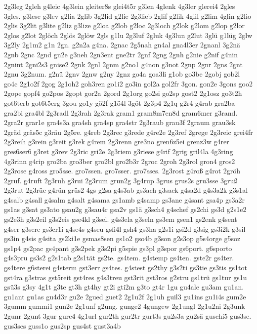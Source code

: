 {2g3leg
2gleh
g4leic
4g3lein
gleiter8s
glei4t5r
g3len
4glenk
4g3ler
glerei4
2gles
3gles.
g3lese
g3lev
g2lia
2glib
3g2lid
g2lie
2g3lieb
2glif
g2lik
4glil
g2lim
4glin
g2lio
2glis
3g2lit
g3lite
g2liz
g3lize
g2loa
g2lob
g2loc
2g3loch
g2lok
g2lom
g2lop
g2lor
2glos
g2lot
2glöch
2glös
2glöw
2gls
g1lu
2g3luf
2gluk
4g3lun
g2lut
3glü
g1lüg
2glw
3g2ly
2g1m2
g1n
2gn.
g2n2a
g4na.
2gnac
2g5nah
gn4al
gna4l3er
2gnanl
3g2nä
2gnb
2gnc
2gnd
gn2e
g3neh
2gn3ent
gne2tr
2gnf
2gng
2gnh
g2nie
g2nif
g4nin
2gnint
2gni2s3
gnise2
2gnk
2gnl
2gnm
g2no1
g4non
g3not
2gnp
2gnr
2gns
2gnt
2gnu
3g2num.
g2nü
2gnv
2gnw
g2ny
2gnz
go4a
goa3li
g1ob
go3be
2gobj
gob2l
go4c
2g1o2f
2gog
2g1oh2
goh3ren
go1i2
go3in
gol2a
gol2fr
3gon.
gon2e
3gons
goo2
2gope
gopf4
go2pos
2gopt
gor2a
2gord
2g1org
go2si
go2sp
gost2
2g1osz
go3t2h
got6terb
got6t5erg
3gou
go1y
gö2f
g1ö4l
3göt
2g3p4
2g1q
g2r4
g4rab
gra2ba
gra2bi
gra4bl
2g3radl
2g3rah
2g3rak
gram1
gram8m7en8d
gram6mer
g3rand.
2gra2r
grar1e
gra4s3a
gra4sh
gra4sp
gra4str
2g3raub
grau3f
2graum
grau3sk
2gräd
gräs5c
g3räu
2g5re.
g4reb
2g3rec
g3rede
g4re2e
2g3ref
2grege
2g3reic
grei4fr
2g3reih
g3rein
g3reit
g3rek
g4rem
2g3renn
gre3no
gren6z5ei
grenz3w
g4rer
gres6ser6
g3ret
g3rev
2g3ric
gri2e
2g3riem
g3riese
g4rif
2grig
gril4la
4g3ring
4g3rinn
g4rip
gro2ba
gro3ber
gro2bl
gro2b3r
2groc
2groh
2g3rol
gron4
gros2
2g3rose
g4ross
gro5sse.
gro7ssen.
gro7sser.
gro7sses.
2g3rost
g4roß
g4rot
2gröh
2gruf.
g4ruft
2g3ruh
g3rui
2g3rum
grun2g
3g4rup
3grus
grus2s
gru3sse
3gruß
2g3rut
2g3rüc
g4rün
grüs2
4gs
g2sa
g4s3ab
gs3ach
g3sack
g4sa2d
g4s3a2k
g3s1al
g4salb
g4sall
g4salm
g4salt
g4sama
gs1amb
g4samp
gs3ane
g4sant
gsa4p
gs3a2r
gs1as
g3sat
gs3ato
gsau2g
g3sau4r
gsa2v
gs1ä
g3sch4
g4schef
gs2chi
gs3d
g2s1e2
gs2e3h
g3s2eil
g3s2eis
gse4kl
g3sel.
g4s3ela
g3seln
gs3em
gsen1
gs2enk
g4sent
g4ser
g3sere
gs3er1i
g4se4s
g4seu
gsfi4l
gsh4
gs3ha
g2s1i
gsi2d
g3sig
gs3i2k
g3sil
gs3in
g4sis
g4sita
gs2ki1e
gsmas8sen
gs1o2
gso4b
g3son
g2s3op
g5s4orge
g5soz
gs1p4
gs2pac
gs4pant
g3s2pek
g3s2pi
g5spie
gs3pl
g3spor
gs6port.
g6sporto
g4s3pru
gs3s2
g2s1tab
g2s1tät
gs2te.
gs4tem.
g4stemp
gs4ten.
gste2r
gs4ter.
gs4tere
g6sterei
g4sterm
gst3err
gs4tes.
g4stest
gs2thy
g3s2ti
gs3tie
gs3tis
gs1tot
gst4ra
g3stras
gst5reit
gst4res
g4s3treu
gst3rit
gst3ros
g2stru
gs1trü
gs1tur
gs1u
gsü3s
g3sy
4g1t
g3te
gt3h
gt4hy
gt2i
gti2m
g3to
gt4r
1gu
gu4ale
gu3am
gu1an.
gu1ant
gu1as
gu4d3r
gu2e
2gued
guet2
2g1u2f
2g1uh
guil3
gu1ins
gu1i4s
gum2e
3gumm
gummi1
gun2e
2g1unf
g2ung.
gunge2
4gungew
2g1ungl
2g1u2ni
2g3unk
2gunr
2gunt
3gur
gure4
4g1url
gur2th
gur2tr
gurt3s
gu2s3a
gu2sä
guschi5
gus3se.
gus3ses
guss1o
gus2sp
gus4st
gust3a4b
}
